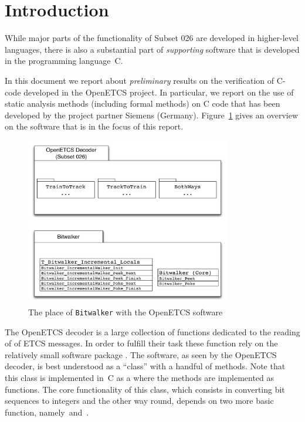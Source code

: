 
\section{Introduction}

While major parts of the functionality of {Subset 026} are developed in 
higher-level languages, there is also a substantial part of \emph{supporting} software
that is developed in the programming language~C.

In this document we report about \emph{preliminary} results on the verification
of C-code developed in the OpenETCS project.
In particular, we report on the use of static analysis methods (including formal methods)
on C code that has been developed by the project partner Siemens (Germany).
Figure~\ref{fig:Bitwalker-Overview} gives an overview on the software that
is in the focus of this report.

\begin{figure}[hbt]
\begin{center}
\includegraphics[width=0.8\textwidth]{figures/Bitwalker-Overview.pdf}
\caption{\label{fig:Bitwalker-Overview} The place of \texttt{Bitwalker} with the OpenETCS software}
\end{center}
\end{figure}

The OpenETCS decoder is a large collection of functions dedicated to
the reading of of ETCS messages.
In order to fulfill their task these function rely on the relatively
small software package .
The  software, as seen by the OpenETCS decoder,
is best understood as a ``class'' with a handful of methods.
Note that this class is implemented in~C as a  where
the methods are implemented as functions.
The core functionality  of this class, which consists in converting bit sequences to integers
and the other way round, depends on two more basic function, namely~\peek and~\poke.

